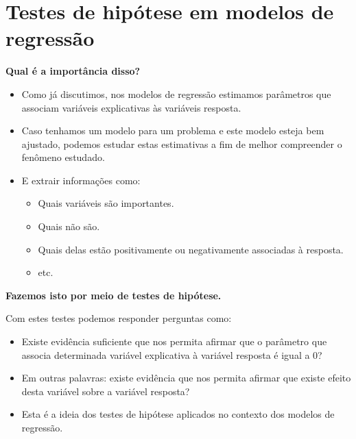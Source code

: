\documentclass[10pt,
  aspectratio=169,
  serif,
  mathserif,
  professionalfont,
  compress,
  handout,
  ]{beamer}\usepackage[]{graphicx}\usepackage[]{color}
\begin{document}

\section{Testes de hipótese em modelos de regressão}

\begin{frame}[c, allowframebreaks]

\textbf{Qual é a importância disso?}

\begin{itemize}

  \item Como já discutimos, nos modelos de regressão estimamos parâmetros que associam variáveis explicativas às variáveis resposta.

  \item Caso tenhamos um modelo para um problema e este modelo esteja bem ajustado, podemos estudar estas estimativas a fim de melhor compreender o fenômeno estudado. 
  
  \item E extrair informações como:
  
  \begin{itemize}
    \item Quais variáveis são importantes.
    \item Quais não são.
    \item Quais delas estão positivamente ou negativamente associadas à resposta.
    \item etc.
  \end{itemize}
\end{itemize}

\end{frame}

\begin{frame}[c, allowframebreaks]

\textbf{Fazemos isto por meio de testes de hipótese.}

\hspace{1cm}

Com estes testes podemos responder perguntas como:

\begin{itemize}

  \item Existe evidência suficiente que nos permita afirmar que o parâmetro que associa determinada variável explicativa à variável resposta é igual a 0?

  \item Em outras palavras: existe evidência que nos permita afirmar que existe efeito desta variável sobre a variável resposta?

  \item Esta é a ideia dos testes de hipótese aplicados no contexto dos modelos de regressão.

\end{itemize}

\end{frame}
\end{document}
